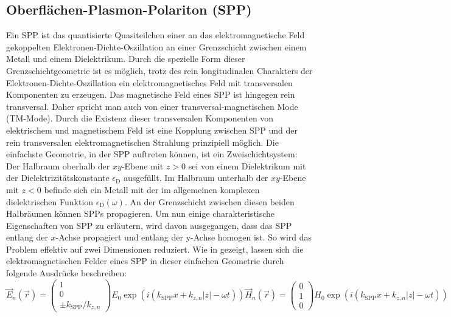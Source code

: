 \documentclass[titlepage,  ngerman]{article}
\begin{document}
	\subsection{Oberflächen-Plasmon-Polariton (SPP)}
	\label{sec:spp}		
	Ein SPP ist das quantisierte Quasiteilchen einer an das elektromagnetische Feld gekoppelten Elektronen-Dichte-Oszillation an einer Grenzschicht zwischen einem Metall und einem Dielektrikum. Durch die spezielle Form dieser Grenzschichtgeometrie ist es möglich, trotz des rein longitudinalen Charakters der Elektronen-Dichte-Oszillation ein elektromagnetisches Feld mit transversalen Komponenten zu erzeugen. Das magnetische Feld eines SPP ist hingegen rein transversal. Daher spricht man auch von einer transversal-magnetischen Mode (TM-Mode). Durch die Existenz dieser transversalen Komponenten von elektrischem und magnetischem Feld ist eine Kopplung zwischen SPP und der rein transversalen elektromagnetischen Strahlung prinzipiell möglich. Die einfachste Geometrie, in der SPP auftreten können, ist ein Zweischichtsystem: Der Halbraum oberhalb der $xy$-Ebene mit $z>0$ sei von einem Dielektrikum mit der Dielektrizitätskonstante $\epsilon_\mathrm{D}$ ausgefüllt. Im Halbraum unterhalb der $xy$-Ebene mit $z<0$ befinde sich ein Metall mit der im allgemeinen komplexen dielektrischen Funktion $\epsilon_\mathrm{D}(\omega)$. An der Grenzschicht zwischen diesen beiden Halbräumen können SPPs propagieren. Um nun einige charakteristische Eigenschaften von SPP zu erläutern, wird davon ausgegangen, dass das SPP entlang der $x$-Achse propagiert und entlang der y-Achse homogen ist. So wird das Problem effektiv auf zwei Dimensionen reduziert. Wie in \cite{Maier.2007} gezeigt, lassen sich die elektromagnetischen Felder eines SPP in dieser einfachen Geometrie durch folgende Ausdrücke beschreiben:
	\begin{subequations}
		\label{eq:fields_spp}
		\begin{equation}
			\label{eq:electric_field_spp}
			\vec{E}_n(\vec{r}) = \begin{pmatrix} 1 \\ 0 \\ \pm k_{\mathrm{SPP}}/k_{z,n} \end{pmatrix} E_0 \exp\left(i(k_{\mathrm{SPP}}x + k_{z, n}|z|-\omega t)\right)	
		\end{equation}
		\begin{equation}
			\label{eq:magnetic_field_spp}
			\vec{H}_n(\vec{r}) = \begin{pmatrix} 0 \\ 1 \\ 0 \end{pmatrix} H_0 \exp\left(i(k_{\mathrm{SPP}}x + k_{z, n}|z|-\omega t)\right)
		\end{equation}
	\end{subequations}
\end{document}
